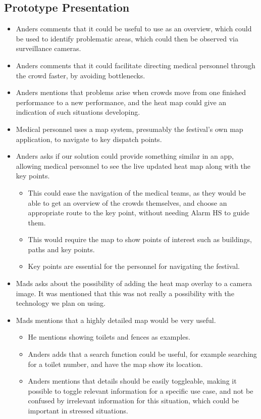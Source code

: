 \subsection*{Prototype Presentation}
\begin{itemize}
    \item Anders comments that it could be useful to use as an overview, which could be used to identify problematic areas, which could then be observed via surveillance cameras.
    \item Anders comments that it could facilitate directing medical personnel through the crowd faster, by avoiding bottlenecks.
    \item Anders mentions that problems arise when crowds move from one finished performance to a new performance, and the heat map could give an indication of such situations developing.
    \item Medical personnel uses a map system, presumably the festival's own map application, to navigate to key dispatch points.
    \item Anders asks if our solution could provide something similar in an app, allowing medical personnel to see the live updated heat map along with the key points.
    \begin{itemize}
        \item This could ease the navigation of the medical teams, as they would be able to get an overview of the crowds themselves, and choose an appropriate route to the key point, without needing Alarm HS to guide them.
        \item This would require the map to show points of interest such as buildings, paths and key points.
        \item Key points are essential for the personnel for navigating the festival.
    \end{itemize}
    \item Mads asks about the possibility of adding the heat map overlay to a camera image. It was mentioned that this was not really a possibility with the technology we plan on using.
    \item Mads mentions that a highly detailed map would be very useful.
    \begin{itemize}
        \item He mentions showing toilets and fences as examples.
        \item Anders adds that a search function could be useful, for example searching for a toilet number, and have the map show its location.
        \item Anders mentions that details should be easily toggleable, making it possible to toggle relevant information for a specific use case, and not be confused by irrelevant information for this situation, which could be important in stressed situations.

\end{itemize}
\end{itemize}
